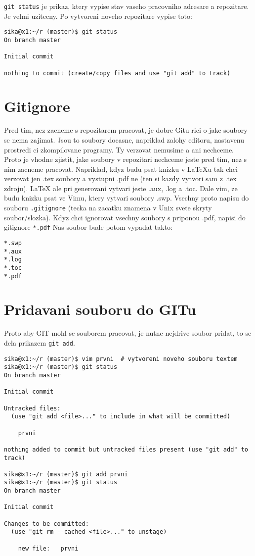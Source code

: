 \documentclass[12pt,a5paper]{article}
\begin{document}
\lstinline|git status| je prikaz, ktery vypise stav vaseho pracovniho adresare a repozitare. Je velmi uzitecny. Po vytvoreni noveho repozitare vypise toto:

\begin{lstlisting}
sika@x1:~/r (master)$ git status
On branch master

Initial commit

nothing to commit (create/copy files and use "git add" to track)
\end{lstlisting}

\section{Gitignore}

Pred tim, nez zacneme s repozitarem pracovat, je dobre Gitu rici o jake soubory se nema zajimat. Jsou to soubory docasne, napriklad zalohy editoru, nastavenu prostredi ci zkompilovane programy. Ty verzovat nemusime a ani nechceme. Proto je vhodne zjistit, jake soubory v repozitari nechceme jeste pred tim, nez s nim zacneme pracovat. Napriklad, kdyz budu psat knizku v LaTeXu tak chci verzovat jen .tex soubory a vystupni .pdf ne (ten si kazdy vytvori sam z .tex zdroju). LaTeX ale pri generovani vytvari jeste .aux, .log a .toc. Dale vim, ze budu knizku psat ve Vimu, ktery vytvari soubory .swp. Vsechny proto napisu do souboru \lstinline|.gitignore| (tecka na zacatku znamena v Unix svete skryty soubor/slozka). Kdyz chci ignorovat vsechny soubory s priponou .pdf, napisi do gitignore \lstinline|*.pdf| Nas soubor bude potom vypadat takto:

\begin{lstlisting}
*.swp
*.aux
*.log
*.toc
*.pdf

\end{lstlisting}

\section{Pridavani souboru do GITu}

Proto aby GIT mohl se souborem pracovat, je nutne nejdrive soubor pridat, to se dela prikazem \lstinline|git add|.

\begin{lstlisting}
sika@x1:~/r (master)$ vim prvni  # vytvoreni noveho souboru textem
sika@x1:~/r (master)$ git status
On branch master

Initial commit

Untracked files:
  (use "git add <file>..." to include in what will be committed)

    prvni

nothing added to commit but untracked files present (use "git add" to track)

sika@x1:~/r (master)$ git add prvni
sika@x1:~/r (master)$ git status
On branch master

Initial commit

Changes to be committed:
  (use "git rm --cached <file>..." to unstage)

    new file:   prvni
\end{lstlisting}
\end{document}
